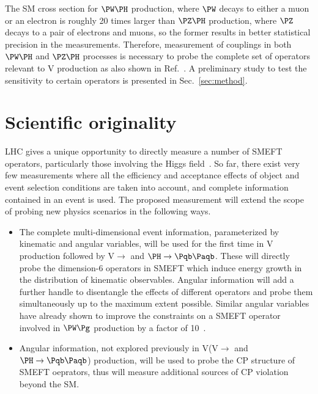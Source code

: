 \documentclass[a4paper,11pt]{article}
\newcommand{\Pb}{{{\Pqb}}\xspace}
\newcommand{\PAb}{{{{\Paqb}}}\xspace}
\renewcommand{\PV}{{{{V}}}\xspace}
\newcommand{\VH}{{{\PV}{\PH}}\xspace}
\begin{document}
The SM cross section for $\PW\PH$ production, where $\PW$ decays to either a muon or an electron is roughly 20 times larger than $\PZ\PH$ production, where $\PZ$ decays to a pair of electrons and muons, 
so the former results in better statistical precision in the measurements.
Therefore, measurement of couplings in both $\PW\PH$ and $\PZ\PH$ processes is necessary to probe the complete set of operators relevant to \VH production as also shown in Ref.~\cite{Banerjee:2019twi}.
A preliminary study to test the sensitivity to certain operators is presented in Sec.~\ref{sec:method}. 


\section{Scientific originality}

LHC gives a unique opportunity to directly measure a number of SMEFT operators, particularly those involving the Higgs field~\cite{Elias-Miro:2013mua,Gupta:2014rxa}. 
So far, there exist very few measurements where all the efficiency and acceptance effects of object and event selection conditions are taken into account, and complete information contained in an event is used.
The proposed measurement will extend the scope of probing new physics scenarios in the following ways.%
\begin{itemize}

\item The complete multi-dimensional event information, parameterized by kinematic and angular variables, will be used for the first time in \VH production followed by \PV $\to$ \Pl \Pl and $\PH \to \Pb \PAb$. 
These will directly probe the dimension-6 operators in SMEFT which induce energy growth in the distribution of kinematic observables. 
Angular information will add a further handle to disentangle the effects of different operators and 
probe them simultaneously  up to the maximum extent possible.
Similar angular variables have already shown to improve the constraints on a SMEFT operator involved in $\PW\Pg$ production by a factor of 10~\cite{CMS-PAS-SMP-20-005}.

\item Angular information, not explored previously in \VH (\PV $\to$ \Pl \Pl and $\PH \to \Pb \PAb$) production, will be used to probe the CP structure of SMEFT oeprators, thus will measure additional sources of CP violation beyond the SM.

\end{itemize}
\end{document}
